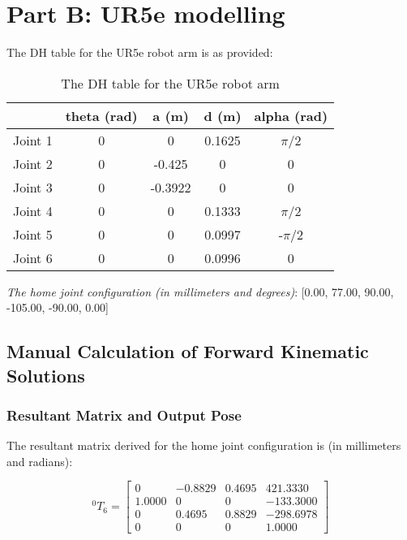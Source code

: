 \section{Part B: UR5e modelling}

The DH table for the UR5e robot arm is as provided:
\begin{table}[H]
    \centering
    \begin{tabular}{|c|c|c|c|c|}
        \hline
                & \textbf{theta (rad)} & \textbf{a (m)} & \textbf{d (m)} & \textbf{alpha (rad)} \\ \hline
        Joint 1 & 0                    & 0              & 0.1625         & $\pi$/2              \\ \hline
        Joint 2 & 0                    & -0.425         & 0              & 0                    \\ \hline
        Joint 3 & 0                    & -0.3922        & 0              & 0                    \\ \hline
        Joint 4 & 0                    & 0              & 0.1333         & $\pi$/2              \\ \hline
        Joint 5 & 0                    & 0              & 0.0997         & -$\pi$/2             \\ \hline
        Joint 6 & 0                    & 0              & 0.0996         & 0                    \\ \hline
    \end{tabular}
    \caption{The DH table for the UR5e robot arm}
    \label{table:DH-UR5e default}
\end{table}

\textit{The home joint configuration (in  millimeters and degrees)}: [0.00, 77.00, 90.00, -105.00, -90.00, 0.00]

\subsection{Manual Calculation of Forward Kinematic Solutions}
\subsubsection{Resultant Matrix and Output Pose}

The resultant matrix derived for the home joint configuration is (in millimeters and radians):

\begin{equation*}
    ^{0}T_{6} = \begin{bmatrix}
        0      & -0.8829 & 0.4695 & 421.3330  \\
        1.0000 & 0       & 0      & -133.3000 \\
        0      & 0.4695  & 0.8829 & -298.6978 \\
        0      & 0       & 0      & 1.0000
    \end{bmatrix}
\end{equation*}


